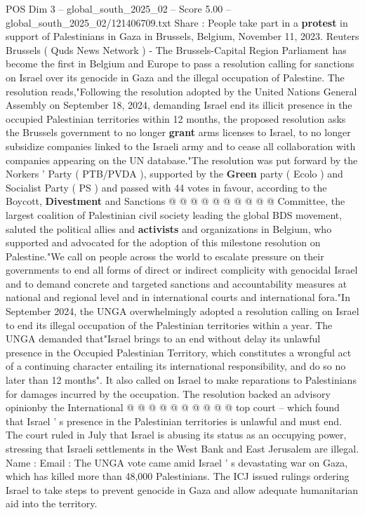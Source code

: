 \begin{textsample}{POS Dim 3 – global\_south\_2025\_02 – Score 5.00 – global\_south\_2025\_02/121406709.txt}  \label{ex:f3_pos_446}
Share : People take part in a \textbf{protest} in support of Palestinians in Gaza in Brussels, Belgium, November 11, 2023.
Reuters Brussels ( Quds News Network ) - The Brussels-Capital Region Parliament has become the first in Belgium and Europe to pass a resolution calling for sanctions on Israel over its genocide in Gaza and the illegal occupation of Palestine.
The resolution reads,"Following the resolution adopted by the United Nations General Assembly on September 18, 2024, demanding Israel end its illicit presence in the occupied Palestinian territories within 12 months, the proposed resolution asks the Brussels government to no longer \textbf{grant} arms licenses to Israel, to no longer subsidize companies linked to the Israeli army and to cease all collaboration with companies appearing on the UN database."The resolution was put forward by the Norkers ' Party ( PTB/PVDA ), supported by the \textbf{Green} party ( Ecolo ) and Socialist Party ( PS ) and passed with 44 votes in favour, according to the Boycott, \textbf{Divestment} and Sanctions @ @ @ @ @ @ @ @ @ @ Committee, the largest coalition of Palestinian civil society leading the global BDS movement, saluted the political allies and \textbf{activists} and organizations in Belgium, who supported and advocated for the adoption of this milestone resolution on Palestine."We call on people across the world to escalate pressure on their governments to end all forms of direct or indirect complicity with genocidal Israel and to demand concrete and targeted sanctions and accountability measures at national and regional level and in international courts and international fora."In September 2024, the UNGA overwhelmingly adopted a resolution calling on Israel to end its illegal occupation of the Palestinian territories within a year.
The UNGA demanded that"Israel brings to an end without delay its unlawful presence in the Occupied Palestinian Territory, which constitutes a wrongful act of a continuing character entailing its international responsibility, and do so no later than 12 months".
It also called on Israel to make reparations to Palestinians for damages incurred by the occupation.
The resolution backed an advisory opinionby the International @ @ @ @ @ @ @ @ @ @ top court -- which found that Israel ' s presence in the Palestinian territories is unlawful and must end.
The court ruled in July that Israel is abusing its status as an occupying power, stressing that Israeli settlements in the West Bank and East Jerusalem are illegal.
Name : Email : The UNGA vote came amid Israel ' s devastating war on Gaza, which has killed more than 48,000 Palestinians.
The ICJ issued rulings ordering Israel to take steps to prevent genocide in Gaza and allow adequate humanitarian aid into the territory.

\end{textsample}
